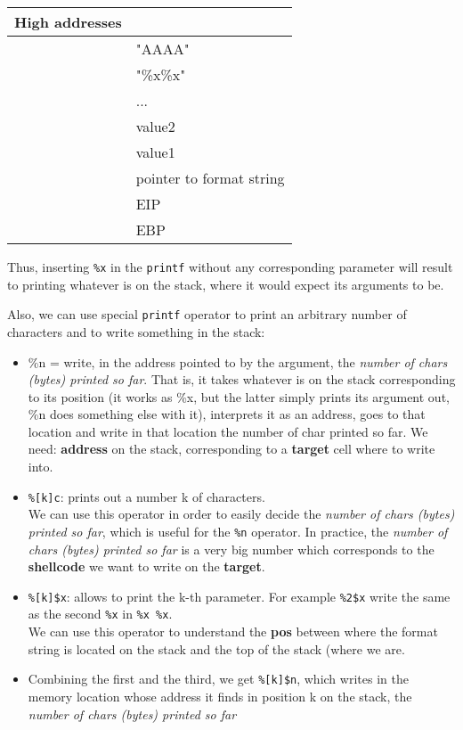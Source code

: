 \documentclass[
]{article}
\providecommand{\tightlist}{%
  \setlength{\itemsep}{0pt}\setlength{\parskip}{0pt}}
\begin{document}
\begin{longtable}[]{@{}ll@{}}
\toprule\noalign{}
High addresses & \\
\midrule\noalign{}
\endhead
\bottomrule\noalign{}
\endlastfoot
& "AAAA" \\
& "\%x\%x" \\
& ... \\
& value2 \\
& value1 \\
& pointer to format string \\
& EIP \\
& EBP \\
\end{longtable}

Thus, inserting \texttt{\%x} in the \texttt{printf} without any
corresponding parameter will result to printing whatever is on the
stack, where it would expect its arguments to be.

Also, we can use special \texttt{printf} operator to print an arbitrary
number of characters and to write something in the stack:

\begin{itemize}
\tightlist
\item
  \%n = write, in the address pointed to by the argument, the
  \emph{number of chars (bytes) printed so far}. That is, it takes
  whatever is on the stack corresponding to its position (it works as
  \%x, but the latter simply prints its argument out, \%n does something
  else with it), interprets it as an address, goes to that location and
  write in that location the number of char printed so far. We need:
  \textbf{address} on the stack, corresponding to a \textbf{target} cell
  where to write into.
\item
  \texttt{\%{[}k{]}c}: prints out a number k of characters.\\
  We can use this operator in order to easily decide the \emph{number of
  chars (bytes) printed so far}, which is useful for the \texttt{\%n}
  operator. In practice, the \emph{number of chars (bytes) printed so
  far} is a very big number which corresponds to the \textbf{shellcode}
  we want to write on the \textbf{target}.
\item
  \texttt{\%{[}k{]}\$x}: allows to print the k-th parameter. For example
  \texttt{\%2\$x} write the same as the second \texttt{\%x} in
  \texttt{\%x\ \%x}.\\
  We can use this operator to understand the \textbf{pos} between where
  the format string is located on the stack and the top of the stack
  (where we are.
\item
  Combining the first and the third, we get \texttt{\%{[}k{]}\$n}, which
  writes in the memory location whose address it finds in position k on
  the stack, the \emph{number of chars (bytes) printed so far}
\end{itemize}
\end{document}
